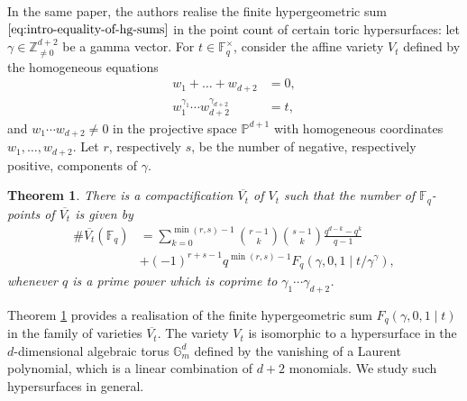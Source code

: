 \documentclass[11pt, reqno]{amsart}
\theoremstyle{plain}
\newtheorem{theo}{Theorem}[section]
\theoremstyle{definition}
\newcommand{\Z}{\mathbb{Z}}
\newcommand{\Ps}{\mathbb{P}}
\newcommand{\Q}{\mathbb{Q}}
\newcommand{\F}{\mathbb{F}}
\newcommand{\ga}{\gamma}
\newcommand{\G}{\mathbb{G}}
\newcommand{\be}{\beta}
\newcommand{\al}{\alpha}
\begin{document}
In the same paper, the authors realise the finite hypergeometric sum $\eqref{eq:intro-equality-of-hg-sums}$ in the point count of certain toric hypersurfaces:
let $\ga \in \Z^{d+2}_{\neq 0}$ be a gamma vector.
For $t \in \F_q^\times$, consider the affine variety $V_{t}$ defined by the homogeneous equations
\begin{align*}
    w_1+ \dots +w_{d+2} &= 0, \\
    w_1^{\gamma_1} \cdots w_{d+2}^{\gamma_{d+2}}  &=t, 
\end{align*}
and $ w_1\cdots w_{d+2} \neq 0$ in the projective space $\Ps^{d+1}$ with homogeneous coordinates $w_1, \dots, w_{d+2}$. 
Let $r$, respectively $s$, be the number of negative, respectively positive, components of $\ga$.
\begin{theo}\cite[Theorem 1.5]{BCM}\label{theo:BCM}
There is a compactification $\overline{V_{t}}$ of $V_{t}$ such that the number of $\F_q$-points of $\overline{V_{t}}$ is given by
\begin{align*}
\#\overline{V_{t}} (\mathbb{F}_q) &= \sum_{k=0}^{\min{(r,s)-1}} {\binom{r-1}{k}}{\binom{s-1}{k}} \frac{q^{d-k} - q^{k} }{q-1}\\
&+ (-1)^{r+s-1} q^{\min(r,s)-1} F_q\left(\gamma,0,1 \mid t/\ga^{\ga}\right),
\end{align*}
whenever $q$ is a prime power which is coprime to $\ga_1\cdots\ga_{d+2}$.
\end{theo}
Theorem \ref{theo:BCM} provides a realisation of the finite hypergeometric sum $F_q(\ga,0,1 \mid t)$ in the family of varieties $\overline{V_{t}}$. The variety $V_{t}$ is isomorphic to a hypersurface in the $d$-dimensional algebraic torus $\G_m^{d}$ defined by the vanishing of a Laurent polynomial, which is a linear combination of $d+2$ monomials. We study such hypersurfaces in general.
\end{document}
